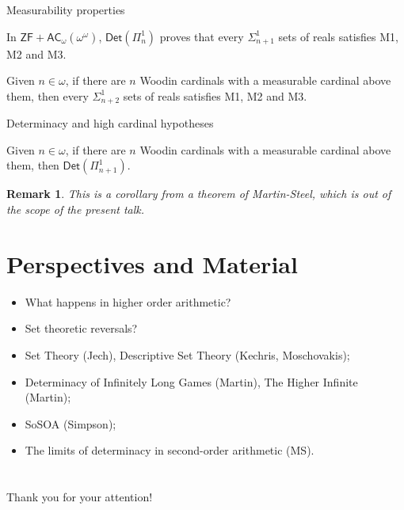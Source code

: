 \documentclass{beamer} %
\newtheorem{remark}[theorem]{Remark}
\begin{document}
\begin{frame}{Measurability properties}

    \begin{theorem}
        In $\mathsf{ZF + AC}_{\omega}(\omega^{\omega})$, $\mathsf{Det}(\Pi^1_n)$ proves that 
        every $\Sigma^1_{n+1}$ sets of reals satisfies M1, M2 and M3.
    \end{theorem}

    \begin{theorem}
        Given $n \in \omega$, if there are $n$ Woodin cardinals with a measurable cardinal above 
        them, then every $\Sigma^1_{n+2}$ sets of reals satisfies M1, M2 and M3.
    \end{theorem}
\end{frame}


\begin{frame}{Determinacy and high cardinal hypotheses}
    \begin{theorem}
        Given $n \in \omega$, if there are $n$ Woodin cardinals with a measurable cardinal above 
        them, then $\mathsf{Det}(\Pi^1_{n+1})$.
    \end{theorem}

    \begin{remark}
        This is a corollary from a theorem of Martin-Steel, which is out of the scope of the 
        present talk.
    \end{remark} 
\end{frame}


\section{Perspectives and Material}

\begin{frame}
    \begin{itemize}
        \item<1-> What happens in higher order arithmetic?
        \item<2-> Set theoretic reversals?
        \item<3-> Set Theory (Jech), Descriptive Set Theory (Kechris, Moschovakis);
        \item<4-> Determinacy of Infinitely Long Games (Martin), The Higher Infinite (Martin);
        \item<5-> SoSOA (Simpson);
        \item<6-> The limits of determinacy in second-order arithmetic (MS).
    \end{itemize}
\end{frame}


\section*{}
\begin{frame}
    \huge{Thank you for your attention!}
\end{frame}
\end{document}
